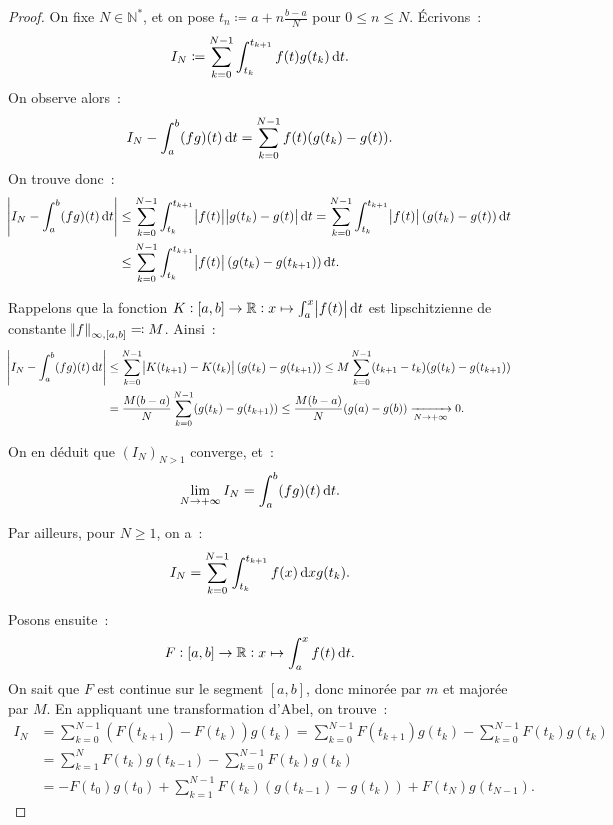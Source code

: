 \documentclass{report}
\theoremstyle{definition}
\theoremstyle{remark}
\numberwithin{equation}{section}
\newcommand{\R}{\mathbb R}
\newcommand{\N}{\mathbb N}
\newcommand{\Ns}{\N^{*}}
\newcommand{\pinfty}{{+\infty}}
\begin{document}
			\begin{proof} On fixe $N \in \Ns$, et on pose $t_n \coloneqq a + n\frac {b-a}N$ pour $0 \leq n \leq N$. Écrivons~:
			\begin{equation}
				I_N \coloneqq \sum_{k=0}^{N-1}\int_{t_k}^{t_{k+1}}f(t)g(t_k)\dif t.
			\end{equation}
			On observe alors~:
			\begin{equation}
				I_N - \int_a^b(fg)(t)\dif t = \sum_{k=0}^{N-1}f(t)(g(t_k) - g(t)).
			\end{equation}
			On trouve donc~:
			\begin{align}
				\abs {I_N - \int_a^b(fg)(t)\dif t} &\leq \sum_{k=0}^{N-1} \int_{t_k}^{t_{k+1}}\abs {f(t)}\abs {g(t_k) - g(t)}\dif t
					= \sum_{k=0}^{N-1}\int_{t_k}^{t_{k+1}}\abs {f(t)}(g(t_k) - g(t))\dif t \\
				&\leq \sum_{k=0}^{N-1}\int_{t_k}^{t_{k+1}}\abs {f(t)}(g(t_k)-g(t_{k+1}))\dif t.
			\end{align}

			Rappelons que la fonction $K : [a, b] \to \R : x \mapsto \int_a^x\abs {f(t)}\dif t$ est lipschitzienne de constante $\norm f_{\infty, [a, b]} \eqqcolon M$.
			Ainsi~:
			\begin{align}
				\abs {I_N - \int_a^b(fg)(t)\dif t} &\leq \sum_{k=0}^{N-1}\abs {K(t_{k+1}) - K(t_k)}(g(t_k)-g(t_{k+1}))
					\leq M\sum_{k=0}^{N-1}(t_{k+1}-t_k)(g(t_k)-g(t_{k+1})) \\
				&= \frac {M(b-a)}N\sum_{k=0}^{N-1}(g(t_k) - g(t_{k+1})) \leq \frac {M(b-a)}N(g(a)-g(b)) \xrightarrow[N \to \pinfty]{} 0.
			\end{align}

			On en déduit que $(I_N)_{N > 1}$ converge, et~:
			\begin{equation}
				\lim_{N \to \pinfty}I_N = \int_a^b(fg)(t)\dif t.
			\end{equation}

			Par ailleurs, pour $N \geq 1$, on a~:
			\begin{equation}
				I_N = \sum_{k=0}^{N-1}\int_{t_k}^{t_{k+1}}f(x)\dif xg(t_k).
			\end{equation}

			Posons ensuite~:
			\begin{equation}
				F : [a, b] \to \R : x \mapsto \int_a^xf(t)\dif t.
			\end{equation}
			On sait que $F$ est continue sur le segment $[a, b]$, donc minorée par $m$ et majorée par $M$. En appliquant une transformation d'Abel, on trouve~:
			\begin{align}
				I_N &= \sum_{k=0}^{N-1}\left(F(t_{k+1}) - F(t_k)\right)g(t_k) = \sum_{k=0}^{N-1}F(t_{k+1})g(t_k) - \sum_{k=0}^{N-1}F(t_k)g(t_k) \\
					&= \sum_{k=1}^NF(t_k)g(t_{k-1}) - \sum_{k=0}^{N-1}F(t_k)g(t_k) \\
					&= -F(t_0)g(t_0) + \sum_{k=1}^{N-1}F(t_k)\left(g(t_{k-1})-g(t_k)\right) + F(t_N)g(t_{N-1}).
			\end{align}


\end{proof}
\end{document}
